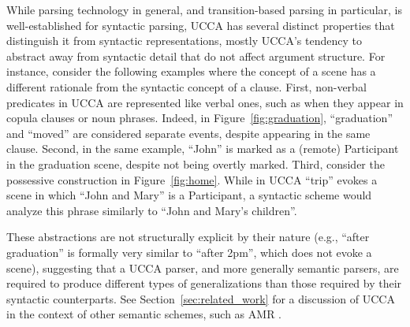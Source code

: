 \documentclass[11pt,a4paper]{article}
\newcommand{\secref}[1]{Section~\ref{#1}}
\newcommand{\figref}[1]{Figure~\ref{#1}}
\begin{document}
While parsing technology in general, and transition-based parsing in particular,
is well-established for syntactic parsing, UCCA
has several distinct properties
that distinguish it from syntactic representations,
mostly UCCA's tendency to abstract away from syntactic detail that do not
affect argument structure.
For instance, consider the following examples where the concept of a scene
has a different rationale from the syntactic concept of a clause.
First, non-verbal predicates in UCCA are represented like verbal ones,
such as when they appear in copula clauses or noun phrases. Indeed,
in \figref{fig:graduation}, ``graduation'' and ``moved'' are considered separate events,
despite appearing in the same clause. 
Second, in the same example, ``John'' is marked as a (remote) Participant
in the graduation scene, despite not being overtly marked.
Third, consider the possessive construction in \figref{fig:home}.
While in UCCA ``trip'' evokes a scene in which ``John and Mary'' is
a Participant, a syntactic scheme would analyze this phrase similarly to ``John and Mary's children''.

These abstractions are not structurally explicit by their nature
(e.g., ``after graduation'' is formally very similar to ``after 2pm'',
which does not evoke a scene), suggesting that a UCCA parser, and more generally semantic parsers,
are required to produce different types of generalizations than those required by their syntactic counterparts.
See \secref{sec:related_work} for a discussion of UCCA in the context of other semantic schemes,
such as AMR \cite{banarescu2013abstract}.

\end{document}
